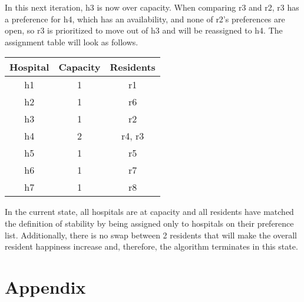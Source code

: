 \documentclass[letterpaper, 10pt,DIV=13]{scrartcl}
\numberwithin{equation}{section} %
\numberwithin{figure}{section} %
\numberwithin{table}{section} %
\begin{document}
In this next iteration, h3 is now over capacity. When comparing r3 and r2, r3 has a preference for h4, which has an availability, and none of r2's preferences are open, so r3 is prioritized to move out of h3 and will be reassigned to h4. The assignment table will look as follows.

\begin{center}
  \begin{tabular}{|c|c|c|}
    \hline
    Hospital & Capacity & Residents \\
    \hline
    h1 & 1 & r1 \\
    \hline
    h2 & 1 & r6 \\
    \hline
    h3 & 1 & r2 \\
    \hline
    h4 & 2 & r4, r3 \\
    \hline
    h5 & 1 & r5 \\
    \hline
    h6 & 1 & r7 \\
    \hline
    h7 & 1 & r8 \\
    \hline
  \end{tabular}
\end{center}

In the current state, all hospitals are at capacity and all residents have matched the definition of stability by being assigned only to hospitals on their preference list. Additionally, there is no swap between 2 residents that will make the overall resident happiness increase and, therefore, the algorithm terminates in this state.

\section{Appendix}
\lstset{numbers=left, numberstyle=\tiny, stepnumber=1, numbersep=5pt}

\end{document}
